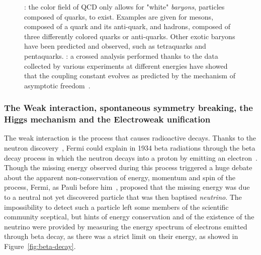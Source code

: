 \begin{figure}[H]
\begin{subfigure}{0.4\linewidth}
			\caption{\label{fig:QCD:B}}
		\end{subfigure}
		\caption{\label{fig:QCD} : the color field of QCD only allows for "white" \textit{baryons}, particles composed of quarks, to exist. Examples are given for mesons, composed of a quark and its anti-quark, and hadrons, composed of three differently colored quarks or anti-quarks. Other exotic baryons have been predicted and observed, such as tetraquarks and pentaquarks. : a crossed analysis performed thanks to the data collected by various experiments at different energies have showed that the coupling constant evolves as predicted by the mechanism of asymptotic freedom~\cite{BETHKE2003}.}
	\end{figure}
	
	\subsubsection*{The Weak interaction, spontaneous symmetry breaking, the Higgs mechanism and the Electroweak unification}
	\label{chapt2:sssec:HiggsEW}
	
	The weak interaction is the process that causes radioactive decays. Thanks to the neutron discovery~\cite{CHADWICK1932}, Fermi could explain in 1934 beta radiations through the beta decay process in which the neutron decays into a proton by emitting an electron~\cite{FERMI1934}. Though the missing energy observed during this process triggered a huge debate about the apparent non-conservation of energy, momentum and spin of the process, Fermi, as Pauli before him~\cite{PAULI1930}, proposed that the missing energy was due to a neutral not yet discovered particle that was then baptised \textit{neutrino}. The impossibility to detect such a particle left some members of the scientific community sceptical, but hints of energy conservation and of the existence of the neutrino were provided by measuring the energy spectrum of electrons emitted through beta decay, as there was a strict limit on their energy, as showed in Figure~\ref{fig:beta-decay}.
	
\begingroup\setlength{\intextsep}{5pt}\setlength{\columnsep}{15pt}
	
